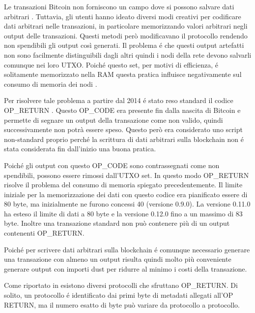 Le transazioni Bitcoin non forniscono un campo dove si possono salvare dati arbitrari \cite{arbdata}. Tuttavia, gli utenti hanno ideato diversi modi creativi per codificare dati arbitrari nelle transazioni, in particolare memorizzando valori arbitrari negli output delle transazioni. Questi metodi però modificavano il protocollo rendendo non spendibili gli output così generati. Il problema é che questi output artefatti non sono facilmente distinguibili dagli altri quindi i nodi della rete devono salvarli comunque nei loro UTXO.
Poiché questo set, per motivi di efficienza, é solitamente memorizzato nella RAM \cite{utxo} questa pratica influisce negativamente sul consumo di memoria dei nodi \cite{stresstest}.

Per risolvere tale problema a partire dal 2014 é stato reso standard il codice OP\_RETURN \cite{opreturnstandard}. Questo OP\_CODE era presente fin dalla nascita di Bitcoin e permette di segnare un output della transazione come non valido, quindi successivamente non potrà essere speso. Questo però era considerato uno script non-standard proprio perché la scrittura di dati arbitrari sulla blockchain non é stata considerata fin dall'inizio una buona pratica.

Poiché gli output con questo OP\_CODE sono contrassegnati come non spendibili, possono essere rimossi dall'UTXO set. In questo modo OP\_RETURN risolve il problema del consumo di memoria spiegato precedentemente. Il limite iniziale per la memorizzazione dei dati con questo codice era pianificato essere di 80 byte, ma inizialmente ne furono concessi 40 (versione 0.9.0).  La versione 0.11.0 \cite{v11} ha esteso il limite di dati a 80 byte e la versione 0.12.0 \cite{v12} fino a un massimo di 83 byte. Inoltre una transazione standard non può contenere più di un output contenenti OP\_RETURN.

Poiché per scrivere dati arbitrari sulla blockchain é comunque necessario generare una transazione con almeno un output risulta quindi molto più conveniente generare output con importi dust per ridurre al minimo i costi della transazione.

Come riportato in \cite{OP_RETURN} esistono diversi protocolli che sfruttano OP\_RETURN. Di solito, un protocollo é identificato dai primi byte di metadati allegati all'OP RETURN, ma il numero esatto di byte può variare da protocollo a protocollo. 

